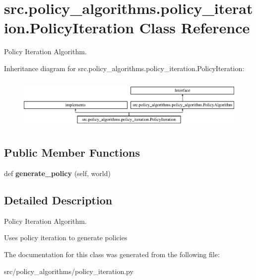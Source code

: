 \hypertarget{classsrc_1_1policy__algorithms_1_1policy__iteration_1_1_policy_iteration}{}\section{src.\+policy\+\_\+algorithms.\+policy\+\_\+iteration.\+Policy\+Iteration Class Reference}
\label{classsrc_1_1policy__algorithms_1_1policy__iteration_1_1_policy_iteration}


Policy Iteration Algorithm.  


Inheritance diagram for src.\+policy\+\_\+algorithms.\+policy\+\_\+iteration.\+Policy\+Iteration\+:\begin{figure}[H]
\begin{center}
\leavevmode
\includegraphics[height=2.560976cm]{classsrc_1_1policy__algorithms_1_1policy__iteration_1_1_policy_iteration}
\end{center}
\end{figure}
\subsection*{Public Member Functions}
\begin{DoxyCompactItemize}
\item 
\mbox{\label{classsrc_1_1policy__algorithms_1_1policy__iteration_1_1_policy_iteration_a7ee703e2982604f37990128d183e5422}} 
def {\bfseries generate\+\_\+policy} (self, world)
\end{DoxyCompactItemize}


\subsection{Detailed Description}
Policy Iteration Algorithm. 

Uses policy iteration to generate policies 

The documentation for this class was generated from the following file\+:\begin{DoxyCompactItemize}
\item 
src/policy\+\_\+algorithms/policy\+\_\+iteration.\+py\end{DoxyCompactItemize}

